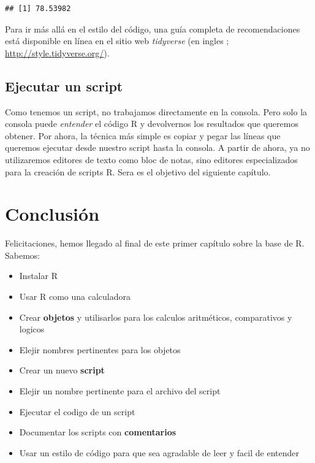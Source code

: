 \documentclass[]{book}
\makeatletter
\providecommand{\tightlist}{%
  \setlength{\itemsep}{0pt}\setlength{\parskip}{0pt}}
\newenvironment{kframe}{%
\medskip{}
\setlength{\fboxsep}{.8em}
 \def\at@end@of@kframe{}%
 \ifinner\ifhmode%
  \def\at@end@of@kframe{\end{minipage}}%
  \begin{minipage}{\columnwidth}%
 \fi\fi%
 \def\FrameCommand##1{\hskip\@totalleftmargin \hskip-\fboxsep
 \colorbox{shadecolor}{##1}\hskip-\fboxsep
     \hskip-\linewidth \hskip-\@totalleftmargin \hskip\columnwidth}%
 \MakeFramed {\advance\hsize-\width
   \@totalleftmargin\z@ \linewidth\hsize
   \@setminipage}}%
 {\par\unskip\endMakeFramed%
 \at@end@of@kframe}
\newenvironment{rmdblock}[1]
  {
  \begin{itemize}
  \renewcommand{\labelitemi}{
    \raisebox{-.7\height}[0pt][0pt]{
      {\setkeys{Gin}{width=3em,keepaspectratio}\texttt{[image: myIcons/\#1]}} %
    }
  }
  \setlength{\fboxsep}{1em}
  \begin{kframe}
  \item
  }
  {
  \end{kframe}
  \end{itemize}
  }
\newenvironment{rmdstyle}     %
  {\begin{rmdblock}{style}}   %
  {\end{rmdblock}}            %
\makeatother
\begin{document}
\begin{verbatim}
## [1] 78.53982
\end{verbatim}

\begin{rmdstyle}
Para ir más allá en el estilo del código, una guía completa de
recomendaciones está disponible en línea en el sitio web
\emph{tidyverse} (en ingles ; \url{http://style.tidyverse.org/}).
\end{rmdstyle}

\subsection{Ejecutar un script}\label{ejecutar-un-script}

Como tenemos un script, no trabajamos directamente en la consola. Pero
solo la consola puede \emph{entender} el código R y devolvernos los
resultados que queremos obtener. Por ahora, la técnica más simple es
copiar y pegar las líneas que queremos ejecutar desde nuestro script
hasta la consola. A partir de ahora, ya no utilizaremos editores de
texto como bloc de notas, sino editores especializados para la creación
de scripts R. Sera es el objetivo del siguiente capítulo.

\section{Conclusión}\label{conclusion}

Felicitaciones, hemos llegado al final de este primer capítulo sobre la
base de R. Sabemos:

\begin{itemize}
\tightlist
\item
  Instalar R
\item
  Usar R como una calculadora
\item
  Crear \textbf{objetos} y utilisarlos para los calculos aritméticos,
  comparativos y logicos
\item
  Elejir nombres pertinentes para los objetos
\item
  Crear un nuevo \textbf{script}
\item
  Elejir un nombre pertinente para el archivo del script
\item
  Ejecutar el codigo de un script
\item
  Documentar los scripts con \textbf{comentarios}
\item
  Usar un estilo de código para que sea agradable de leer y facil de
  entender
\end{itemize}
\end{document}
